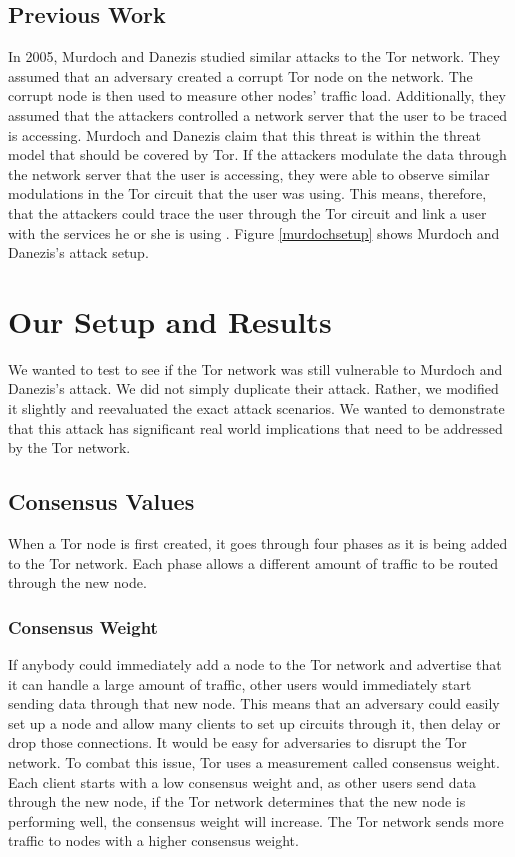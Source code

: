 \documentclass[12pt,journal]{IEEEtran}
\begin{document}
\subsection{Previous Work}
In 2005, Murdoch and Danezis studied similar attacks to the Tor network. They assumed that an adversary created a corrupt Tor node on the network. The corrupt node is then used to measure other nodes' traffic load. Additionally, they assumed that the attackers controlled a network server that the user to be traced is accessing. Murdoch and Danezis claim that this threat is within the threat model that should be covered by Tor. If the attackers modulate the data through the network server that the user is accessing, they were able to observe similar modulations in the Tor circuit that the user was using. This means, therefore, that the attackers could trace the user through the Tor circuit and link a user with the services he or she is using \cite{Murdoch:2005:LTA:1058433.1059390}. Figure \ref{murdochsetup} shows Murdoch and Danezis's attack setup.

\section{Our Setup and Results}
We wanted to test to see if the Tor network was still vulnerable to Murdoch and Danezis's attack. We did not simply duplicate their attack. Rather, we modified it slightly and reevaluated the exact attack scenarios. We wanted to demonstrate that this attack has significant real world implications that need to be addressed by the Tor network.
\subsection{Consensus Values}
When a Tor node is first created, it goes through four phases as it is being added to the Tor network. Each phase allows a different amount of traffic to be routed through the new node.
\subsubsection{Consensus Weight}
If anybody could immediately add a node to the Tor network and advertise that it can handle a large amount of traffic, other users would immediately start sending data through that new node. This means that an adversary could easily set up a node and allow many clients to set up circuits through it, then delay or drop those connections. It would be easy for adversaries to disrupt the Tor network. To combat this issue, Tor uses a measurement called consensus weight. Each client starts with a low consensus weight and, as other users send data through the new node, if the Tor network determines that the new node is performing well, the consensus weight will increase. The Tor network sends more traffic to nodes with a higher consensus weight.
\end{document}
